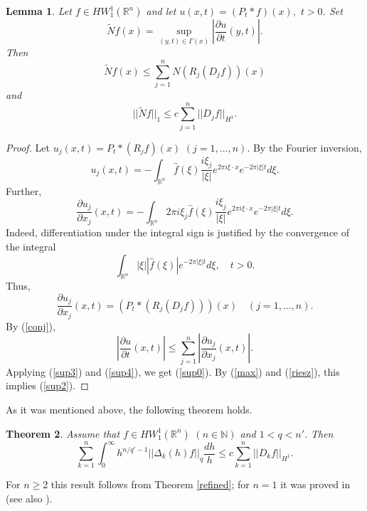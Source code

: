 \documentclass[12pt,twoside,reqno]{amsart}
\numberwithin{equation}{section}
\newtheorem{teo}{Theorem}[section]
\newtheorem{lem}[teo]{Lemma}
\theoremstyle{definition}
\numberwithin{equation}{section}
\def\R{\mathbb{R}}
\def\N{\mathbb{N}}
\begin{document}
\begin{lem}\label{Supp} Let $f\in HW_1^1(\R^n)$ and let $u(x,t)=(P_t\ast f)(x),$ $t>0$. Set
\begin{equation}\label{sup1}
\widetilde{N}f(x)= \sup_{(y,t)\in \Gamma(x)}\left|\frac{\partial u}{\partial{t}}(y,t)\right|.
\end{equation}
Then
\begin{equation}\label{sup0}
\widetilde{N}f(x)\le \sum_{j=1}^n N(R_j(D_jf))(x)
\end{equation}
and
\begin{equation}\label{sup2}
||\widetilde{N}f||_1\le c\sum_{j=1}^n||D_jf||_{H^1}.
\end{equation}
\end{lem}
\begin{proof} Let $u_j(x,t)=P_t\ast(R_jf)(x)$ $(j=1,...,n)$. By the Fourier inversion,
$$
u_j(x,t)=-\int_{\R^n}\widehat f(\xi)\frac{i\xi_j}{|\xi|}e^{2\pi i\xi\cdot x}e^{-2\pi|\xi|t}d\xi.
$$
 Further,
$$
\frac{\partial u_j}{\partial{x_j}}(x,t)=-\int_{\R^n}2\pi i\xi_j\widehat f(\xi)\frac{i\xi_j}{|\xi|}e^{2\pi i\xi\cdot x}e^{-2\pi|\xi|t}d\xi.
$$
Indeed, differentiation under the integral sign is justified by the convergence of the integral
$$
\int_{\R^n}|\xi||\widehat f(\xi)|e^{-2\pi|\xi|t}d\xi, \quad t>0.
$$
Thus,
\begin{equation}\label{sup4}
\frac{\partial u_j}{\partial{x_j}}(x,t)=(P_t\ast (R_j(D_jf)))(x) \quad(j=1,...,n).
\end{equation}
By (\ref{conj}),
\begin{equation}\label{sup3}
\left|\frac{\partial u}{\partial{t}}(x,t)\right|\le \sum_{j=1}^n \left|\frac{\partial u_j}{\partial{x_j}}(x,t)\right|.
\end{equation}
Applying (\ref{sup3}) and (\ref{sup4}), we get (\ref{sup0}). By (\ref{max}) and (\ref{riesz}),
this implies (\ref{sup2}).
\end{proof}








As it was mentioned above, the following theorem holds.
\begin{teo}\label{Hardy1} Assume that  $f\in HW_1^1(\R^n)\,\,(n\in\N)$ and $1<q<n'.$  Then
$$
\sum_{k=1}^n\int_0^\infty h^{n/q'-1}||\Delta_k(h)f||_{q}\frac{dh}{h}\le c \sum_{k=1}^n||D_kf||_{H^1}.
$$
\end{teo}
For $n\ge 2$ this result follows from Theorem  \ref{refined}; for $n=1$ it was proved in \cite{Oswald} (see also \cite{K88}).
\end{document}
